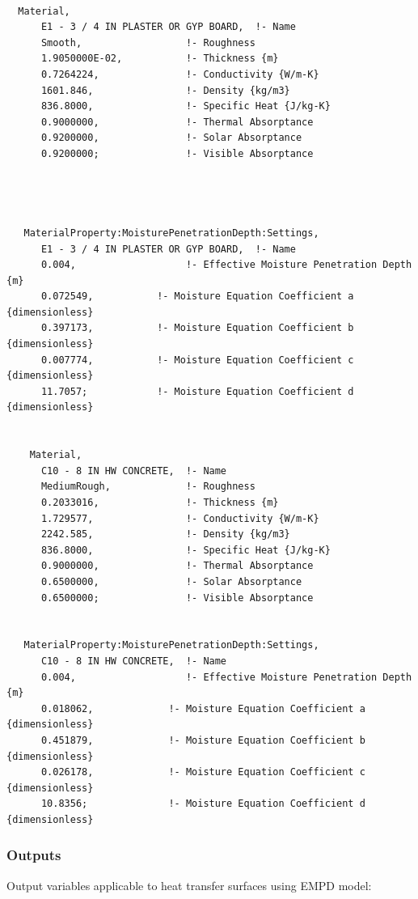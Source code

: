 \begin{lstlisting}

  Material,
      E1 - 3 / 4 IN PLASTER OR GYP BOARD,  !- Name
      Smooth,                  !- Roughness
      1.9050000E-02,           !- Thickness {m}
      0.7264224,               !- Conductivity {W/m-K}
      1601.846,                !- Density {kg/m3}
      836.8000,                !- Specific Heat {J/kg-K}
      0.9000000,               !- Thermal Absorptance
      0.9200000,               !- Solar Absorptance
      0.9200000;               !- Visible Absorptance




   MaterialProperty:MoisturePenetrationDepth:Settings,
      E1 - 3 / 4 IN PLASTER OR GYP BOARD,  !- Name
      0.004,                   !- Effective Moisture Penetration Depth {m}
      0.072549,           !- Moisture Equation Coefficient a {dimensionless}
      0.397173,           !- Moisture Equation Coefficient b {dimensionless}
      0.007774,           !- Moisture Equation Coefficient c {dimensionless}
      11.7057;            !- Moisture Equation Coefficient d {dimensionless}


    Material,
      C10 - 8 IN HW CONCRETE,  !- Name
      MediumRough,             !- Roughness
      0.2033016,               !- Thickness {m}
      1.729577,                !- Conductivity {W/m-K}
      2242.585,                !- Density {kg/m3}
      836.8000,                !- Specific Heat {J/kg-K}
      0.9000000,               !- Thermal Absorptance
      0.6500000,               !- Solar Absorptance
      0.6500000;               !- Visible Absorptance


   MaterialProperty:MoisturePenetrationDepth:Settings,
      C10 - 8 IN HW CONCRETE,  !- Name
      0.004,                   !- Effective Moisture Penetration Depth {m}
      0.018062,             !- Moisture Equation Coefficient a {dimensionless}
      0.451879,             !- Moisture Equation Coefficient b {dimensionless}
      0.026178,             !- Moisture Equation Coefficient c {dimensionless}
      10.8356;              !- Moisture Equation Coefficient d {dimensionless}
\end{lstlisting}

\subsubsection{Outputs}\label{outputs-035}

Output variables applicable to heat transfer surfaces using EMPD model:

